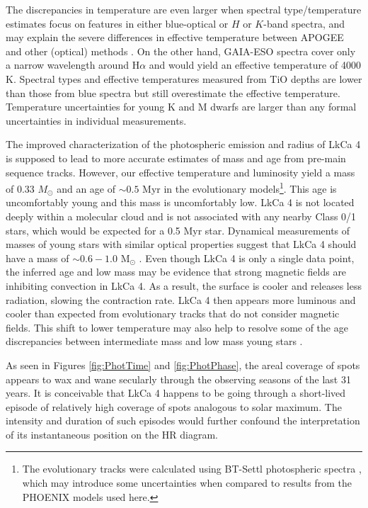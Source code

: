 \documentclass[12pt]{report}
\begin{document}
The discrepancies in temperature are even larger when spectral type/temperature estimates focus on features in either blue-optical or $H$ or $K$-band spectra, and may explain the severe differences in effective temperature between APOGEE and other (optical) methods \citep{cottaar14}.  On the other hand, GAIA-ESO spectra \citep{frasca15} cover only a narrow wavelength around H$\alpha$ and would yield an effective temperature of 4000 K.   Spectral types and effective temperatures measured from TiO depths \citep{herczeg14} are lower than those from blue spectra but still overestimate the effective temperature.  Temperature uncertainties for young K and M dwarfs are larger than any formal uncertainties in individual measurements.

The improved characterization of the photospheric emission and radius of LkCa 4 is supposed to lead to more accurate estimates of mass and age from pre-main sequence tracks.  However, our effective temperature and luminosity yield a mass of 0.33 $M_\odot$ and an age of $\sim 0.5$ Myr in the \citet{baraffe15} evolutionary models\footnote{The \citet{baraffe15} evolutionary tracks were calculated using BT-Settl photospheric spectra \citep{allard14}, which may introduce some uncertainties when compared to results from the PHOENIX models used here.}.  This age is uncomfortably young and this mass is uncomfortably low.  LkCa 4 is not located deeply within a molecular cloud and is not associated with any nearby Class 0/1 stars, which would be expected for a 0.5 Myr star.  Dynamical measurements of masses of young stars with similar optical properties suggest that LkCa 4 should have a mass of $\sim 0.6-1.0$ M$_\odot$ \citep[e.g.][]{guilloteau14,czekala16,rizzuto16}.  Even though LkCa 4 is only a single data point, the inferred age and low mass may be evidence that strong magnetic fields are inhibiting convection in LkCa 4.  As a result, the surface is cooler and releases less radiation, slowing the contraction rate.  LkCa 4 then appears more luminous and cooler than expected from evolutionary tracks that do not consider magnetic fields.   This shift to lower temperature may also help to resolve some of the age discrepancies between intermediate mass and low mass young stars \citep[e.g.][]{herczeg15}.


As seen in Figures \ref{fig:PhotTime} and \ref{fig:PhotPhase}, the areal coverage of spots appears to wax and wane secularly through the observing seasons of the last 31 years.  It is conceivable that LkCa 4 happens to be going through a short-lived episode of relatively high coverage of spots analogous to solar maximum.  The intensity and duration of such episodes would further confound the interpretation of its instantaneous position on the HR diagram.
\end{document}

